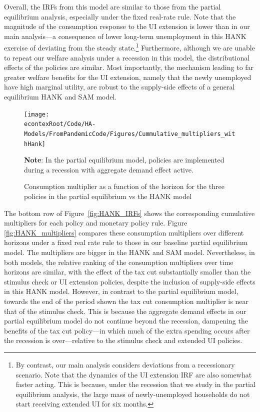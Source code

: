 \documentclass[\econtexRoot/HAFiscal]{subfiles}
\begin{document}
Overall, the IRFs from this model are similar to those from the partial equilibrium analysis, especially under the fixed real-rate rule.
Note that the magnitude of the consumption response to the UI extension is lower than in our main analysis---a consequence of lower long-term unemployment in this HANK exercise of deviating from the steady state.\footnote{By contrast, our main analysis considers deviations from a recessionary scenario.
Note that the dynamics of the UI extension IRF are also somewhat faster acting.
This is because, under the recession that we study in the partial equilibrium analysis, the large mass of newly-unemployed households do not start receiving extended UI for six months.
} Furthermore, although we are unable to repeat our welfare analysis under a recession in this model, the distributional effects of the policies are similar.
Most importantly, the mechanism leading to far greater welfare benefits for the UI extension, namely that the newly unemployed have high marginal utility, are robust to the supply-side effects of a general equilibrium HANK and SAM model.

\begin{figure}[th]
	\begin{center}
		\texttt{[image: \\econtexRoot/Code/HA-Models/FromPandemicCode/Figures/Cummulative\_multipliers\_withHank]}
		\caption{Consumption multiplier as a function of the horizon for the three policies in the partial equilibrium vs the HANK model}
		\parbox{16cm}{\small \vspace{.15cm} \textbf{Note}: In the partial equilibrium model, policies are implemented during a recession with aggregate demand effect active.\normalsize}
		\notinsubfile{\label{fig:HANK_multipliers}}
	\end{center}
\end{figure}


The bottom row of Figure~\ref{fig:HANK_IRFs} shows the corresponding cumulative multipliers for each policy and monetary policy rule.
Figure \ref{fig:HANK_multipliers} compares these consumption multipliers over different horizons under a fixed real rate rule to those in our baseline partial equilibrium model.
The multipliers are bigger in the HANK and SAM model.
Nevertheless, in both models, the relative ranking of the consumption multipliers over time horizons are similar, with the effect of the tax cut substantially smaller than the stimulus check or UI extension policies, despite the inclusion of supply-side effects in this HANK model.
However, in contrast to the partial equilibrium model, towards the end of the period shown the tax cut consumption multiplier is near that of the stimulus check.
This is because the aggregate demand effects in our partial equilibrium model do not continue beyond the recession, dampening the benefits of the tax cut policy---in which much of the extra spending occurs after the recession is over---relative to the stimulus check and extended UI policies.
\end{document}
